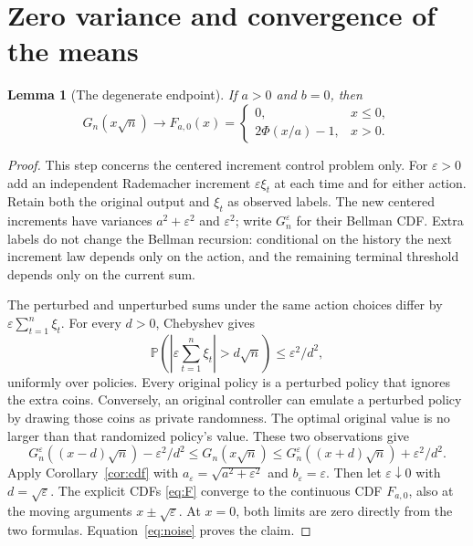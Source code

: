 \documentclass[11pt,a4paper]{article}
\newtheorem{lemma}[theorem]{Lemma}
\newcommand{\Prob}{\mathbb P}
\begin{document}
\section{Zero variance and convergence of the means}
\begin{lemma}[The degenerate endpoint]\label{lem:zero}
If $a>0$ and $b=0$, then
\[
G_n(x\sqrt n)\longrightarrow F_{a,0}(x)
=\begin{cases}0,&x\le0,\\2\Phi(x/a)-1,&x>0.\end{cases}
\]
\end{lemma}
\begin{proof}
This step concerns the centered increment control problem only.
For $\varepsilon>0$ add an independent Rademacher increment
$\varepsilon\xi_t$ at each time and for either action. Retain both the
original output and $\xi_t$ as observed labels. The new centered
increments have variances $a^2+\varepsilon^2$ and $\varepsilon^2$;
write $G_n^\varepsilon$ for their Bellman CDF.
Extra labels do not change the Bellman recursion: conditional on the
history the next increment law depends only on the action, and the
remaining terminal threshold depends only on the current sum.

The perturbed and unperturbed sums under the same action choices differ
by $\varepsilon\sum_{t=1}^n\xi_t$. For every $d>0$, Chebyshev gives
\[
\Prob\left(\left|\varepsilon\sum_{t=1}^n\xi_t\right|>d\sqrt n\right)
\le\varepsilon^2/d^2,
\]
uniformly over policies. Every original policy is a perturbed policy
that ignores the extra coins. Conversely, an original controller can
emulate a perturbed policy by drawing those coins as private randomness.
The optimal original value is no larger than that randomized policy's
value. These two observations give
\begin{equation}\label{eq:noise}
G_n^\varepsilon((x-d)\sqrt n)-\varepsilon^2/d^2
\le G_n(x\sqrt n)
\le G_n^\varepsilon((x+d)\sqrt n)+\varepsilon^2/d^2.
\end{equation}
Apply Corollary~\ref{cor:cdf} with
$a_\varepsilon=\sqrt{a^2+\varepsilon^2}$ and $b_\varepsilon=\varepsilon$.
Then let $\varepsilon\downarrow0$ with $d=\sqrt\varepsilon$.
The explicit CDFs \eqref{eq:F} converge to the continuous CDF $F_{a,0}$,
also at the moving arguments $x\pm\sqrt\varepsilon$. At $x=0$, both
limits are zero directly from the two formulas. Equation~\eqref{eq:noise}
proves the claim.
\end{proof}
\end{document}
